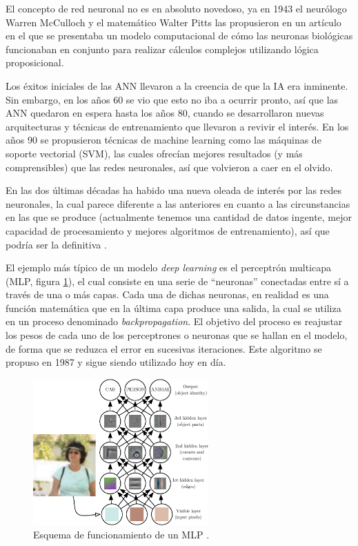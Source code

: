 El concepto de red neuronal no es en absoluto novedoso, ya en 1943 el neurólogo Warren McCulloch y el matemático Walter Pitts las propusieron en un artículo \cite{art:mcculloch1943logical} en el que se presentaba un modelo computacional de cómo las neuronas biológicas funcionaban en conjunto para realizar cálculos complejos utilizando lógica proposicional.

Los éxitos iniciales de las ANN llevaron a la creencia de que la IA era inminente. Sin embargo, en los años 60 se vio que esto no iba a ocurrir pronto, así que las ANN quedaron en espera hasta los años 80, cuando se desarrollaron nuevas arquitecturas y técnicas de entrenamiento que llevaron a revivir el interés. En los años 90 se propusieron técnicas de machine learning como las máquinas de soporte vectorial (SVM), las cuales ofrecían mejores resultados (y más comprensibles) que las redes neuronales, así que volvieron a caer en el olvido.

En las dos últimas décadas ha habido una nueva oleada de interés por las redes neuronales, la cual parece diferente a las anteriores en cuanto a las circunstancias en las que se produce (actualmente tenemos una cantidad de datos ingente, mejor capacidad de procesamiento y mejores algoritmos de entrenamiento), así que podría ser la definitiva \cite{book:homl}.

El ejemplo más típico de un modelo \textit{deep learning} es el perceptrón multicapa (MLP, figura \ref{fig:mlp}), el cual consiste en una serie de ``neuronas'' conectadas entre sí a través de una o más capas. Cada una de dichas neuronas, en realidad es una función matemática que en la última capa produce una salida, la cual se utiliza en un proceso denominado \textit{backpropagation}. El objetivo del proceso es reajustar los pesos de cada uno de los perceptrones o neuronas que se hallan en el modelo, de forma que se reduzca el error en sucesivas iteraciones. Este algoritmo se propuso en 1987 \cite{art:backpropagation} y sigue siendo utilizado hoy en día.

\begin{figure}[H]
	\centering
  \includegraphics[width=0.6\textwidth]{images/mlp}
	\caption{Esquema de funcionamiento de un MLP \cite{book:Goodfellow-et-al-2016}.}
  \label{fig:mlp}
\end{figure}

